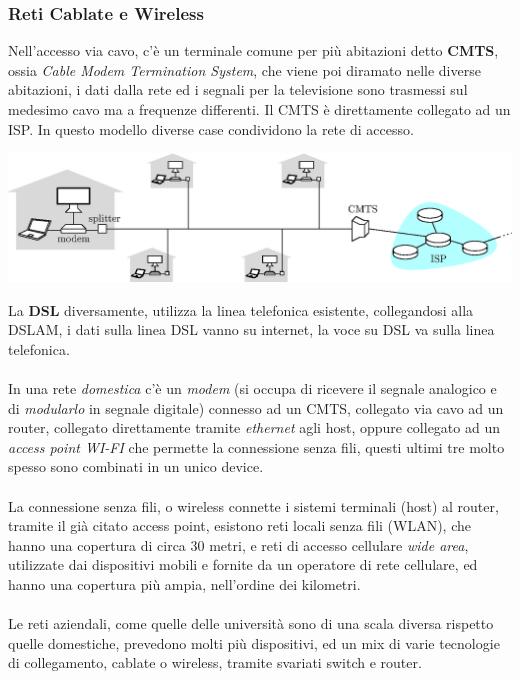 \documentclass[12pt, letterpaper]{article}
\newcommand{\acc}{\\\hphantom{}\\}
\begin{document}
\subsubsection{Reti Cablate e Wireless}
Nell'accesso via cavo, c'è un terminale comune per più abitazioni detto \textbf{CMTS}, ossia \textit{Cable Modem Termination System},
che viene poi diramato nelle diverse abitazioni, i dati dalla rete ed i segnali per la televisione sono trasmessi sul medesimo
cavo ma a frequenze differenti. Il CMTS è direttamente collegato ad un ISP. In questo modello diverse case condividono la rete di
accesso.\begin{center}
    \includegraphics[width=1.1\textwidth ]{images/cableHeadend.eps}
\end{center}
La \textbf{DSL} diversamente, utilizza la linea telefonica esistente, collegandosi alla DSLAM, i dati sulla linea
DSL vanno su internet, la voce su DSL va sulla linea telefonica. \acc
In una rete \textit{domestica}  c'è un \textit{modem}
(si occupa di ricevere il segnale analogico e di  \textit{modularlo} in segnale digitale)
connesso ad un CMTS, collegato via cavo ad
un router, collegato direttamente tramite \textit{ethernet} agli host, oppure collegato ad un \textit{access point WI-FI} che
permette la connessione senza fili, questi ultimi tre molto spesso sono combinati in un unico device.\acc
La connessione senza fili, o wireless connette i sistemi terminali (host) al router, tramite il già citato
access point, esistono reti locali senza fili (WLAN), che hanno una copertura di circa 30 metri, e reti di accesso
cellulare \textit{wide area}, utilizzate dai dispositivi mobili e fornite da un operatore di rete cellulare, ed hanno una
copertura più ampia, nell'ordine dei kilometri.\acc
Le reti aziendali, come quelle delle università sono di una scala diversa rispetto quelle domestiche, prevedono molti più
dispositivi, ed un mix di varie tecnologie di collegamento, cablate o wireless, tramite svariati switch e router.
\end{document}
